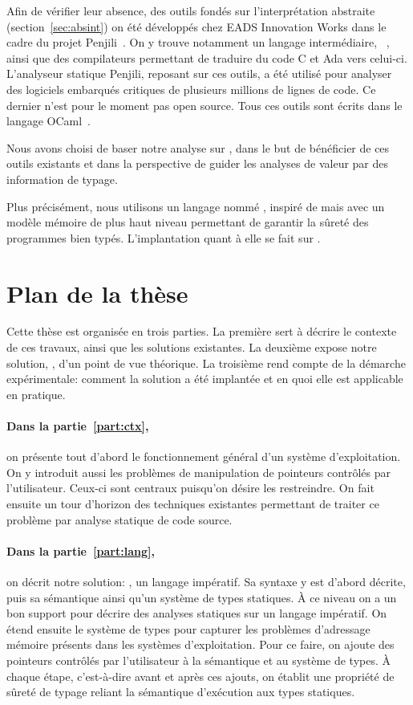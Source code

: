 Afin de vérifier leur absence, des outils fondés sur l'interprétation abstraite
(section~\ref{sec:absint}) on été développés chez EADS Innovation Works dans le
cadre du projet Penjili~. On y trouve notamment un langage
intermédiaire, \newspeak~\cite{newspeak}, ainsi que des compilateurs permettant de
traduire du code C et Ada vers celui-ci. L'analyseur statique Penjili, reposant
sur ces outils, a été utilisé pour analyser des logiciels embarqués critiques de
plusieurs millions de lignes de code. Ce dernier n'est pour le moment pas open
source. Tous ces outils sont écrits dans le langage OCaml~\cite{DAOC}.

Nous avons choisi de baser notre analyse sur \newspeak, dans le but de bénéficier
de ces outils existants et dans la perspective de guider les analyses de valeur
par des information de typage.

Plus précisément, nous utilisons un langage nommé \langname, inspiré de \newspeak
mais avec un modèle mémoire de plus haut niveau permettant de garantir la sûreté
des programmes bien typés. L'implantation quant à elle se fait sur \newspeak.

\section{Plan de la thèse}

Cette thèse est organisée en trois parties. La première sert à décrire le
contexte de ces travaux, ainsi que les solutions existantes. La deuxième expose
notre solution, \langname, d'un point de vue théorique. La troisième rend compte
de la démarche expérimentale: comment la solution a été implantée et en quoi
elle est applicable en pratique.

\paragraph{Dans la partie~\ref{part:ctx},} on présente tout d'abord le
fonctionnement général d'un système d'exploitation. On y introduit aussi les
problèmes de manipulation de pointeurs contrôlés par l'utilisateur. Ceux-ci sont
centraux puisqu'on désire les restreindre. On fait ensuite un tour d'horizon des
techniques existantes permettant de traiter ce problème par analyse statique de
code source.

\paragraph{Dans la partie~\ref{part:lang},} on décrit notre solution:
\langname{}, un langage impératif. Sa syntaxe y est d'abord décrite, puis sa
sémantique ainsi qu'un système de types statiques. À ce niveau on a un bon
support pour décrire des analyses statiques sur un langage impératif. On étend
ensuite le système de types pour capturer les problèmes d'adressage mémoire
présents dans les systèmes d'exploitation. Pour ce faire, on ajoute des
pointeurs contrôlés par l'utilisateur à la sémantique et au système de types. À
chaque étape, c'est-à-dire avant et après ces ajouts, on établit une propriété
de sûreté de typage reliant la sémantique d'exécution aux types statiques.

